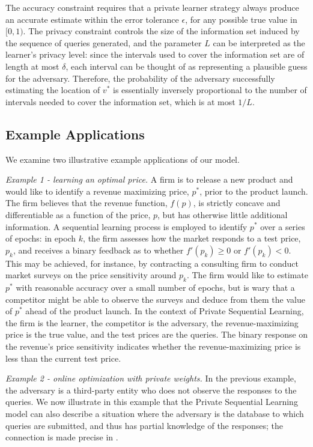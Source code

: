 \documentclass[final,12pt]{colt2018}
\begin{document}
The accuracy constraint requires that a private {learner} strategy always produce an accurate estimate within the error tolerance $\epsilon$, for any possible true value in $[0,1)$. The privacy constraint controls the size of the information set induced by the sequence of queries generated, and the parameter $L$ can be interpreted as the {learner}'s privacy level: since the intervals used to cover the information set are of length at most $\delta$, each interval can be thought of as representing a plausible guess for the adversary. Therefore, the probability of the adversary successfully estimating the location of $v^*$ is essentially inversely proportional to the number of intervals needed to cover the information set, which is at most $1/L$.  


\subsection{{Example Applications} }
We examine two illustrative example applications of our model. 

\emph{Example 1 - learning an optimal price.} A firm is to release a new product and would like to identify a revenue maximizing price, $p^*$, prior to the product launch. The firm believes that the revenue function, $f(p)$, is strictly concave and differentiable as a function of the price, $p$, but has otherwise little additional information. A sequential {learning} process is employed to identify $p^*$ over a series of epochs: in epoch $k$, the firm assesses how the market responds to a test price, $p_k$, and receives a binary feedback as to whether $f'(p_k)\geq0$ or  $f'(p_k)< 0$. This may be achieved, for instance, by contracting a consulting firm to conduct market surveys on the price sensitivity around $p_k$. The firm would like to estimate $p^*$ with reasonable accuracy over a small number of epochs, but is wary that a competitor might be able to observe the surveys and deduce from them the value of $p^*$ ahead of the product launch. In the context of Private Sequential {Learning}, the firm is the {learner}, the competitor is the adversary, the revenue-maximizing price is the true value, and the test prices are the queries. The binary response on the revenue's price sensitivity indicates whether the revenue-maximizing price is less than the current test price. 

\emph{Example 2 - online optimization with private weights.} In the previous example, the adversary is a third-party entity who does not observe the responses to the queries. We now illustrate in this example that the {Private Sequential Learning} model can also describe a situation where the adversary is the database to which queries are submitted, and thus has partial knowledge of the responses; {the connection is made precise in \cite{zhi}.}
\end{document}
